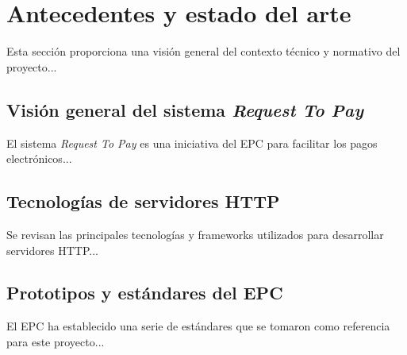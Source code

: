 \section{Antecedentes y estado del arte}
\label{sec:Antecedentes}
Esta sección proporciona una visión general del contexto técnico y normativo del proyecto...

\subsection{Visión general del sistema \textit{Request To Pay}}
\label{subsec:VisionRTP}
El sistema \textit{Request To Pay} es una iniciativa del EPC para facilitar los pagos electrónicos...

\subsection{Tecnologías de servidores HTTP}
\label{subsec:TecnologiasHTTP}
Se revisan las principales tecnologías y frameworks utilizados para desarrollar servidores HTTP...

\subsection{Prototipos y estándares del EPC}
\label{subsec:PrototiposEPC}
El EPC ha establecido una serie de estándares que se tomaron como referencia para este proyecto...
